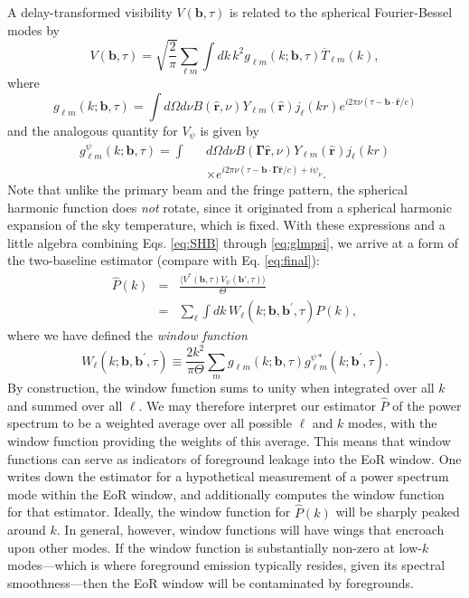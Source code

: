 \documentclass[twocolumn,apj,numberedappendix]{emulateapj}
\renewcommand\[{\begin{equation}}
\renewcommand\]{\end{equation}}
\begin{document}
A delay-transformed visibility $V(\mathbf{b}, \tau) $ is related to the spherical Fourier-Bessel modes by
\begin{equation}
V(\mathbf{b}, \tau) = \sqrt{\frac{2}{\pi}} \sum_{\ell m} \int \! dk\, k^2 g_{\ell m} (k; \mathbf{b}, \tau) \overline{T}_{\ell m} (k),
\end{equation}
where
\begin{equation}
g_{\ell m} (k ; \mathbf{b}, \tau) = \int \! d\Omega d\nu B(\hat{\mathbf{r}},\nu) Y_{\ell m} (\hat{\mathbf{r}}) j_\ell (k r) e^{i 2 \pi \nu (\tau - \mathbf{b}\cdot \hat{\mathbf{r}} / c)}
\end{equation}
and the analogous quantity for $V_\psi$ is given by
\begin{eqnarray}
\label{eq:glmpsi}
g_{\ell m}^\psi (k ; \mathbf{b}, \tau) = \int && d\Omega d\nu B(\boldsymbol \Gamma \hat{\mathbf{r}},\nu) Y_{\ell m} (\hat{\mathbf{r}}) j_\ell (k r) \nonumber \\
&& \times  e^{i 2 \pi \nu (\tau - \mathbf{b}\cdot \boldsymbol \Gamma \hat{\mathbf{r}} / c) + i \psi_\nu}.
\end{eqnarray}
Note that unlike the primary beam and the fringe pattern, the spherical harmonic function does \emph{not} rotate, since it originated from a spherical harmonic expansion of the sky temperature, which is fixed. With these expressions and a little algebra combining Eqs. \eqref{eq:SHB} through \eqref{eq:glmpsi}, we arrive at a form of the two-baseline estimator (compare with Eq. \eqref{eq:final}):
\begin{eqnarray}
\hat{P}(k) &=& \frac{ \langle V^{*}(\boldsymbol{b},\tau)V_{\psi}(\boldsymbol{b'},\tau) \rangle}{\Theta} \nonumber \\
&=& \sum_\ell \int \!dk\, W_{\ell}(k; \mathbf{b}, \mathbf{b}^\prime , \tau) P(k),
\end{eqnarray}
where we have defined the \emph{window function}
\begin{equation}
W_{\ell}(k; \mathbf{b}, \mathbf{b}^\prime , \tau) \equiv \frac{2 k^2}{\pi \Theta} \sum_m g_{\ell m} (k ; \mathbf{b}, \tau) g_{\ell m}^{\psi*} (k ; \mathbf{b}^\prime, \tau).
\end{equation}
By construction, the window function sums to unity when integrated over all $k$ and summed over all $\ell$. We may therefore interpret our estimator $\hat{P}$ of the power spectrum to be a weighted average over all possible $\ell$ and $k$ modes, with the window function providing the weights of this average. This means that window functions can serve as indicators of foreground leakage into the EoR window. One writes down the estimator for a hypothetical measurement of a power spectrum mode within the EoR window, and additionally computes the window function for that estimator. Ideally, the window function for $\hat{P}(k)$ will be sharply peaked around $k$. In general, however, window functions will have wings that encroach upon other modes. If the window function is substantially non-zero at low-$k$ modes---which is where foreground emission typically resides, given its spectral smoothness---then the EoR window will be contaminated by foregrounds.
\end{document}
